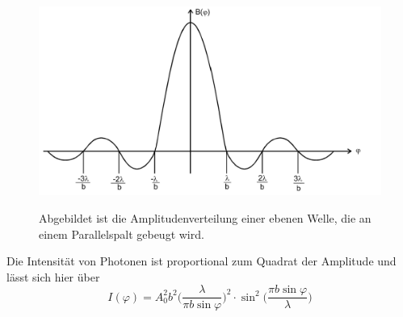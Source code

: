  \begin{figure}[H]
    \centering
    \caption{Abgebildet ist die Amplitudenverteilung einer ebenen Welle, die an einem Parallelspalt gebeugt wird.}
    \includegraphics{Bilder/Amplitude.png}
    \label{fig:Amplitude}
\end{figure}

Die Intensität von Photonen ist proportional zum Quadrat der Amplitude und lässt sich hier über 
\begin{equation}
    I(\varphi)=A_0^2 b^2 \biggl( \frac{\lambda}{\pi b \sin \varphi}\biggr)^2 \cdot \sin^2 \biggl( \frac{\pi b \sin \varphi}{\lambda}\biggr)
\end{equation}
